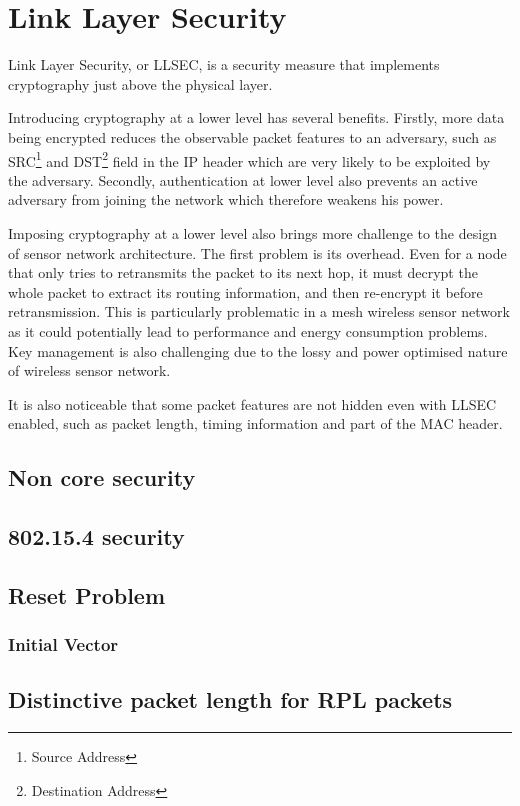 \chapter{Link Layer Security}

Link Layer Security, or LLSEC, is a security measure that implements cryptography just above the physical layer.

Introducing cryptography at a lower level has several benefits. Firstly, more data being encrypted reduces the observable packet features to an adversary, such as SRC\footnote{Source Address} and DST\footnote{Destination Address} field in the IP header which are very likely to be exploited by the adversary. Secondly, authentication at lower level also prevents an active adversary from joining the network which therefore weakens his power. 

Imposing cryptography at a lower level also brings more challenge to the design of sensor network architecture. The first problem is its overhead. Even for a node that only tries to retransmits the packet to its next hop, it must decrypt the whole packet to extract its routing information, and then re-encrypt it before retransmission. This is particularly problematic in a mesh wireless sensor network as it could potentially lead to performance and energy consumption problems. Key management is also challenging due to the lossy and power optimised nature of wireless sensor network.

It is also noticeable that some packet features are not hidden even with LLSEC enabled, such as packet length, timing information and part of the MAC header.

\section{Non core security} \label{sec: noncoresec}

\section{802.15.4 security}

\section{Reset Problem}
\subsection{Initial Vector}

\section{Distinctive packet length for RPL packets}
